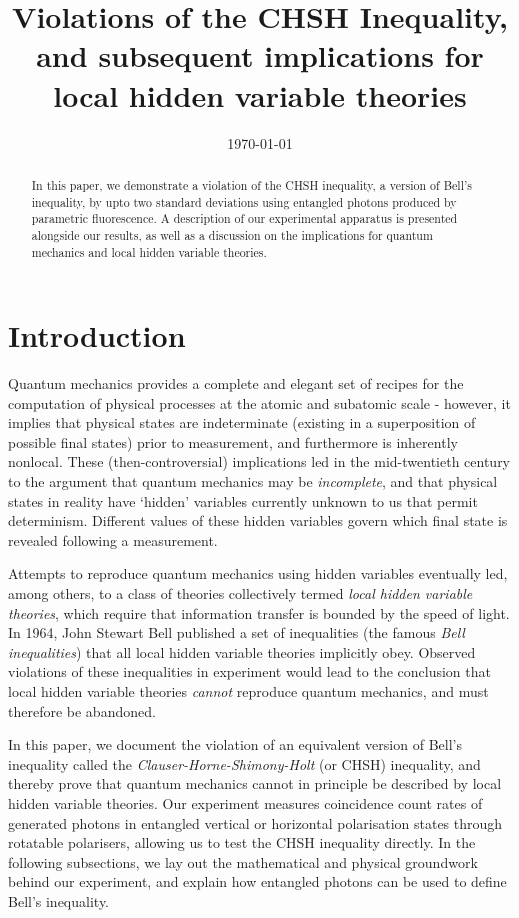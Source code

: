 \documentclass[aps,prl,nofootinbib,twocolumn,superscriptaddress,groupedaddress]{revtex4}  %
\begin{document}
\title{Violations of the CHSH Inequality, and subsequent implications for local hidden variable theories}
\date{\today}

\begin{abstract}
In this paper, we demonstrate a violation of the CHSH inequality, a version of Bell's inequality, by upto two standard deviations using entangled photons produced by parametric fluorescence. A description of our experimental apparatus is presented alongside our results, as well as a discussion on the implications for quantum mechanics and local hidden variable theories. 
\end{abstract}

\maketitle

\section{Introduction}

Quantum mechanics provides a complete and elegant set of recipes for the computation of physical processes at the atomic and subatomic scale - however, it implies that physical states are indeterminate (existing in a superposition of possible final states) prior to measurement, and furthermore is inherently nonlocal. These (then-controversial) implications led in the mid-twentieth century to the argument that quantum mechanics may be \textsl{incomplete}, and that physical states in reality have `hidden' variables currently unknown to us that permit determinism. Different values of these hidden variables govern which final state is revealed following a measurement. 

Attempts to reproduce quantum mechanics using hidden variables eventually led, among others, to a class of theories collectively termed \textsl{local hidden variable theories}, which require that information transfer is bounded by the speed of light. In 1964, John Stewart Bell published a set of inequalities (the famous \textsl{Bell inequalities}) that all local hidden variable theories implicitly obey. Observed violations of these inequalities in experiment would lead to the conclusion that local hidden variable theories \textit{cannot} reproduce quantum mechanics, and must therefore be abandoned.

In this paper, we document the violation of an equivalent version of Bell's inequality called the \textit{Clauser-Horne-Shimony-Holt} (or CHSH) inequality, and thereby prove that quantum mechanics cannot in principle be described by local hidden variable theories. Our experiment measures coincidence count rates of generated photons in entangled vertical or horizontal polarisation states through rotatable polarisers, allowing us to test the CHSH inequality directly. In the following subsections, we lay out the mathematical  and physical groundwork behind our experiment, and explain how entangled photons can be used to define Bell's inequality.
\end{document}
